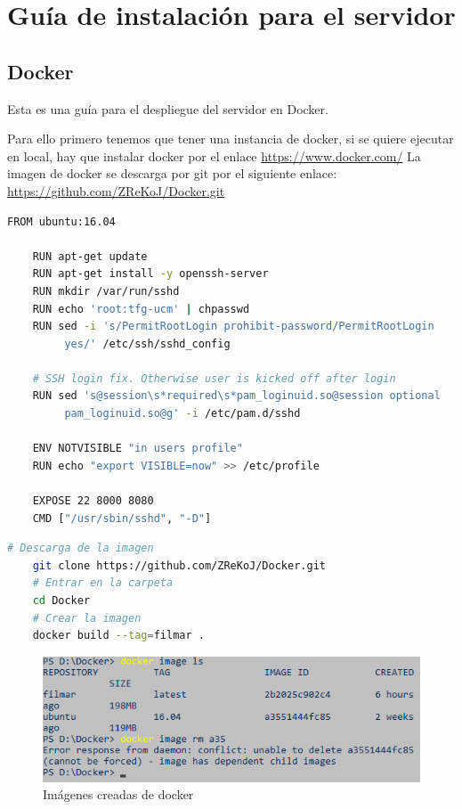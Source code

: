 
\cleardoublepage

\chapter{Guía de instalación para el servidor}
\label{app:guia_instalacion}

\section{Docker}
\label{app:docker}
Esta es una guía para el despliegue del servidor en Docker.

Para ello primero tenemos que tener una instancia de docker, si se quiere ejecutar en local, 
hay que instalar docker por el enlace \url{https://www.docker.com/}
La imagen de docker se descarga por git por el siguiente enlace:
\url{https://github.com/ZReKoJ/Docker.git}

\begin{lstlisting}[language=bash, caption=Dockerfile]
    FROM ubuntu:16.04

    RUN apt-get update 
    RUN apt-get install -y openssh-server
    RUN mkdir /var/run/sshd
    RUN echo 'root:tfg-ucm' | chpasswd
    RUN sed -i 's/PermitRootLogin prohibit-password/PermitRootLogin
         yes/' /etc/ssh/sshd_config
    
    # SSH login fix. Otherwise user is kicked off after login
    RUN sed 's@session\s*required\s*pam_loginuid.so@session optional
         pam_loginuid.so@g' -i /etc/pam.d/sshd
    
    ENV NOTVISIBLE "in users profile"
    RUN echo "export VISIBLE=now" >> /etc/profile
    
    EXPOSE 22 8000 8080
    CMD ["/usr/sbin/sshd", "-D"]
\end{lstlisting}

\begin{lstlisting}[language=bash, caption=Descarga de la imagen de docker]
    # Descarga de la imagen
    git clone https://github.com/ZReKoJ/Docker.git 
    # Entrar en la carpeta
    cd Docker 
    # Crear la imagen
    docker build --tag=filmar . 
\end{lstlisting}

\begin{figure}[H]
    \centering
    \includegraphics[width=6in]{figures/appendix-A/list-docker-images.png}
    \caption{Imágenes creadas de docker}
\end{figure}

